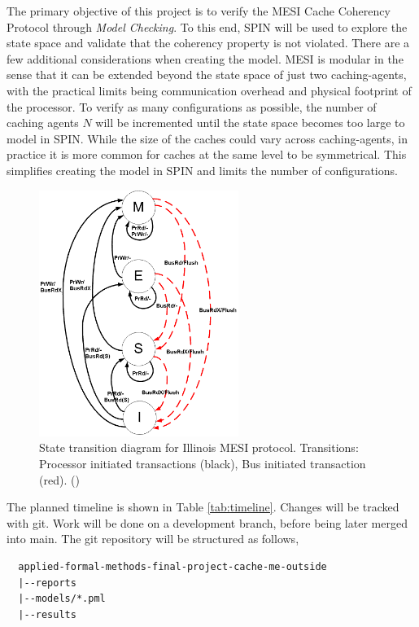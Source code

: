 \documentclass[12pt]{article}
\begin{document}
The primary objective of this project is to verify the MESI Cache Coherency Protocol through \textit{Model Checking}. To this end, SPIN will be used to explore the state space and validate that the coherency property is not violated. There are a few additional considerations when creating the model. MESI is modular in the sense that it can be extended beyond the state space of just two caching-agents, with the practical limits being communication overhead and physical footprint of the processor. To verify as many configurations as possible, the number of caching agents $N$ will be incremented until the state space becomes too large to model in SPIN. While the size of the caches could vary across caching-agents, in practice it is more common for caches at the same level to be symmetrical. This simplifies creating the model in SPIN and limits the number of configurations.
 

\begin{figure}
    \centering
    \includegraphics[height=8cm]{images/State_transition_diagram_for_the_Illinois_MESI_protocol.png}
    \caption{State transition diagram for Illinois MESI protocol. Transitions: Processor initiated transactions (black), Bus initiated transaction (red). (\cite{culler1998})}
    \label{fig:statetransitiondiagram}
\end{figure}

The planned timeline is shown in Table \ref{tab:timeline}. Changes will be tracked with git. Work will be done on a development branch, before being later merged into main. The git repository will be structured as follows,
\begin{verbatim}
  applied-formal-methods-final-project-cache-me-outside
  |--reports
  |--models/*.pml
  |--results
\end{verbatim}
\end{document}
